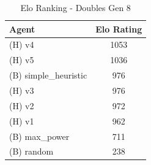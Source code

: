 \begin{table}[htbp]
\caption{Elo Ranking - Doubles Gen 8}
\label{tab:elo_doubles_gen_8}
\begin{tabular}{lc}
\toprule
Agent & Elo Rating \\
\midrule
(H) v4 & 1053 \\
(H) v5 & 1036 \\
(B) simple\_heuristic & 976 \\
(H) v3 & 976 \\
(H) v2 & 972 \\
(H) v1 & 962 \\
(B) max\_power & 711 \\
(B) random & 238 \\
\bottomrule
\end{tabular}
\end{table}
